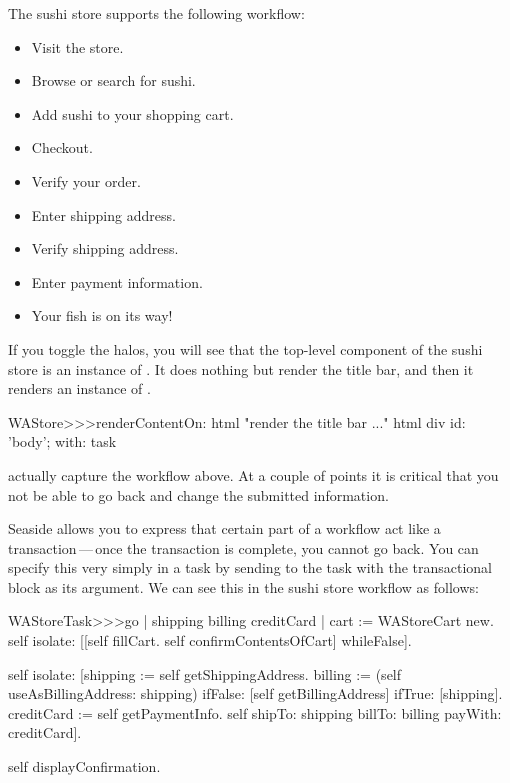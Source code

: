 \documentclass[a4paper,10pt,twoside]{book}
\begin{document}
The sushi store supports the following workflow:
\begin{itemize}
  \item Visit the store.
  \item Browse or search for sushi.
  \item Add sushi to your shopping cart.
  \item Checkout.
  \item Verify your order.
  \item Enter shipping address.
  \item Verify shipping address.
  \item Enter payment information.
  \item Your fish is on its way!
\end{itemize}

If you toggle the halos, you will see that the top-level component of the sushi store is an instance of .
It does nothing but render the title bar, and then it renders an instance of .

\begin{code}{}
WAStore>>>renderContentOn: html
	"render the title bar ..."
	html div id: 'body'; with: task
\end{code}

 actually capture the workflow above.
At a couple of points it is critical that you not be able to go back and change the submitted information.


Seaside allows you to express that certain part of a workflow act like a transaction\,---\,once the transaction is complete, you cannot go back.
You can specify this very simply in a task by sending  to the task with the transactional block as its argument.
We can see this in the sushi store workflow as follows:

\begin{code}{}
WAStoreTask>>>go
	| shipping billing creditCard |
	cart := WAStoreCart new.
	self isolate:
		[[self fillCart.
		self confirmContentsOfCart]
			whileFalse].

	self isolate:
		[shipping := self getShippingAddress.
		billing := (self useAsBillingAddress: shipping)
					ifFalse: [self getBillingAddress]
					ifTrue: [shipping].
		creditCard := self getPaymentInfo.
		self shipTo: shipping billTo: billing payWith: creditCard].

	self displayConfirmation.
\end{code}
\end{document}
